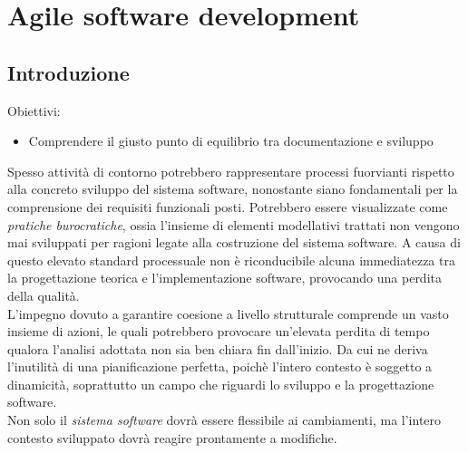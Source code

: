 \documentclass{article}
\begin{document}
\pagestyle{empty}
\section*{Agile software development}
\large

\subsection*{Introduzione}
\large
Obiettivi:
\begin{itemize}
    \renewcommand{\labelitemi}{-}
    \itemsep0em
    \item Comprendere il giusto punto di equilibrio tra documentazione e sviluppo
\end{itemize}
Spesso attività di contorno potrebbero rappresentare processi fuorvianti rispetto alla concreto sviluppo del sistema software, nonostante siano fondamentali per la comprensione dei requisiti funzionali posti. Potrebbero essere visualizzate come \textit{pratiche burocratiche}, ossia l'insieme di elementi modellativi trattati non vengono mai sviluppati per ragioni legate alla costruzione del sistema software. A causa di questo elevato standard processuale non è riconducibile alcuna immediatezza tra la progettazione teorica e l'implementazione software, provocando una perdita della qualità.\vspace*{14pt}\\  
L'impegno dovuto a garantire coesione a livello strutturale comprende un vasto insieme di azioni, le quali potrebbero provocare un'elevata perdita di tempo qualora l'analisi adottata non sia ben chiara fin dall'inizio. Da cui ne deriva l'inutilità di una pianificazione perfetta, poichè l'intero contesto è soggetto a dinamicità, soprattutto un campo che riguardi lo sviluppo e la progettazione software.\vspace*{14pt}\\
Non solo il \textit{sistema software} dovrà essere flessibile ai cambiamenti, ma l'intero contesto sviluppato dovrà reagire prontamente a modifiche.
\end{document}
